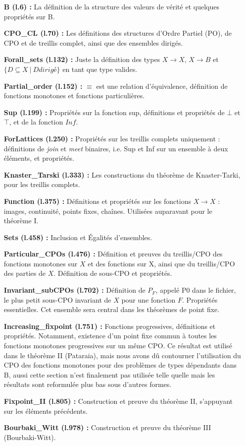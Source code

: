 \documentclass{article}
\newcommand\code[1]{{\fontfamily{lmtt}\selectfont #1}}
\theoremstyle{definition}
\begin{document}
\begin{itemize}
\item[\textbf{B (l.6) :}] La définition de la structure des valeurs de vérité et quelques propriétés sur B.
\item[\textbf{CPO\_CL (l.70) :}] Les définitions des structures d'Ordre Partiel (PO), de CPO et de treillis complet, ainsi que des ensembles dirigés.
\item[\textbf{Forall\_sets (l.132) :}] Juste la définition des types $X \rightarrow X$, $X \rightarrow B$ et $\{ D \subseteq X ~ | ~ D dirigé \}$ en tant que type valides.
\item[\textbf{Partial\_order (l.152) :}] $\equiv$ est une relation d'équivalence, définition de fonctions monotones et fonctions particulières.
\item[\textbf{Sup (l.199) :}] Propriétés sur la fonction sup, définitions et propriétés de $\bot$ et $\top$, et de la fonction $Inf$.
\item[\textbf{ForLattices (l.250) :}] Propriétés sur les treillis complets uniquement : définitions de \textit{join} et \textit{meet} binaires, i.e. Sup et Inf sur un ensemble à deux éléments, et propriétés.
\item[\textbf{Knaster\_Tarski (l.333) :}] Les constructions du théorème de Knaster-Tarki, pour les treillis complets.
\item[\textbf{Function (l.375) :}] Définitions et propriétés sur les fonctions $X \rightarrow X$ : images, continuité, points fixes, chaînes. Utilisées auparavant pour le théorème I.
\item[\textbf{Sets (l.458) :}] Inclusion et Égalités d'ensembles.
\item[\textbf{Particular\_CPOs (l.476) :}] Définition et preuves du treillis/CPO des fonctions monotones sur $X$ et des fonctions sur X, ainsi que du treillis/CPO des parties de $X$. Définition de sous-CPO et propriétés.
\item[\textbf{Invariant\_subCPOs (l.702) :}] Définition de $P_F$, appelé \code{P0} dans le fichier, le plus petit sous-CPO invariant de $X$ pour une fonction $F$. Propriétés essentielles. Cet ensemble sera central dans les théorèmes de point fixe.
\item[\textbf{Increasing\_fixpoint (l.751) :}] Fonctions progressives, définitions et propriétés. Notamment, existence d'un point fixe commun à toutes les fonctions monotones progressives sur un même CPO. Ce résultat est utilisé dans le théorème II (Pataraia), mais nous avons dû contourner l'utilisation du CPO des fonctions monotones pour des problèmes de types dépendants dans B, aussi cette section n'est finalement pas utilisée telle quelle mais les résultats sont reformulée plus bas sous d'autres formes.
\item[\textbf{Fixpoint\_II (l.805) :}] Construction et preuve du théorème II, s'appuyant sur les éléments précédents.
\item[\textbf{Bourbaki\_Witt (l.978) :}] Construction et preuve du théorème III (Bourbaki-Witt).
\end{itemize}
\end{document}
